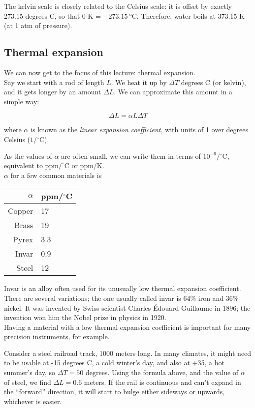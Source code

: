 The kelvin scale is closely related to the Celsius scale: it is offset by exactly 273.15 degrees C, so that 0 K = $\SI{-273.15}{\degreeCelsius}$. Therefore, water boils at 373.15 K (at 1 atm of pressure).

\subsection{Thermal expansion}

We can now get to the focus of this lecture: thermal expansion.\\
Say we start with a rod of length $L$. We heat it up by $\Delta T$ degrees C (or kelvin), and it gets longer by an amount $\Delta L$. We can approximate this amount in a simple way:

\begin{equation}
\Delta L = \alpha L \Delta T
\end{equation}

where $\alpha$ is known as the \emph{linear expansion coefficient}, with units of 1 over degrees Celsius ($1/{}^\circ$C).

As the values of $\alpha$ are often small, we can write them in terms of $10^{-6}/{}^\circ$C, equivalent to $\text{ppm/}^\circ$C or ppm/K.\\
$\alpha$ for a few common materials is

\begin{center}
\begin{tabular}{|r|l|}
\hline
$\alpha$ & ppm/${}^\circ$C\\ \hline
Copper & 17\\\
Brass & 19\\
Pyrex & 3.3\\
Invar & 0.9\\
Steel & 12\\
\hline
\end{tabular}
\end{center}

Invar is an alloy often used for its unusually low thermal expansion coefficient. There are several variations; the one usually called invar is 64\% iron and 36\% nickel. It was invented by Swiss scientist Charles \'{E}douard Guillaume in 1896; the invention won him the Nobel prize in physics in 1920.\\
Having a material with a low thermal expansion coefficient is important for many precision instruments, for example.

Consider a steel railroad track, 1000 meters long. In many climates, it might need to be usable at -15 degrees C, a cold winter's day, and also at +35, a hot summer's day, so $\Delta T = 50$ degrees. Using the formula above, and the value of $\alpha$ of steel, we find $\Delta L = 0.6$ meters. If the rail is continuous and can't expand in the ``forward'' direction, it will start to bulge either sideways or upwards, whichever is easier.

